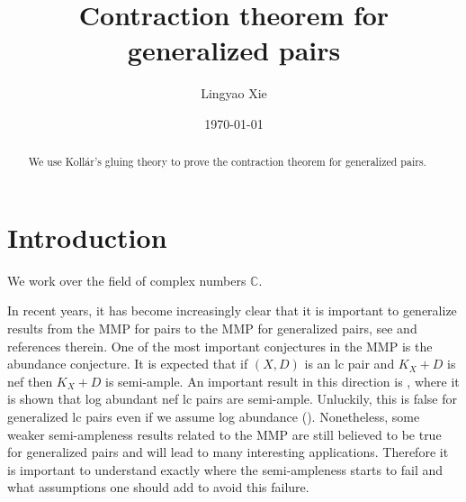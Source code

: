 \documentclass[11pt]{amsart}
\numberwithin{equation}{section}
\newcommand{\Qq}{\mathbb{Q}}
\theoremstyle{definition}
\theoremstyle{definition}
\theoremstyle{definition}
\begin{document}
\title{Contraction theorem for generalized pairs}
\author{Lingyao Xie}




\address{Department of Mathematics, The University of Utah, Salt Lake City, UT 84112, USA}



\date{\today}

\begin{abstract}
We use Koll\'ar's gluing theory to prove the contraction theorem for generalized pairs.%
\end{abstract}


\maketitle
\tableofcontents

\section{Introduction}

We work over the field of complex numbers $\mathbb C$. 

In recent years, it has become increasingly clear that it is important to generalize results from the MMP for pairs to the MMP for generalized pairs, see \cite{Bir21} and references therein. One of the most important conjectures in the MMP is the abundance conjecture. It is expected that if $(X,D)$ is an lc pair and $K_X+D$ is nef then $K_X+D$ is semi-ample. An important result in this direction is \cite{FG14,HX16}, where it is shown that log abundant nef lc pairs are semi-ample. Unluckily, this is false for generalized lc pairs even if we assume log abundance (\cite[Example 1.4]{LX22a}). Nonetheless, some weaker semi-ampleness results related to the MMP are still believed to be true for generalized pairs and will lead to many interesting applications. Therefore it is important to understand exactly where the semi-ampleness starts to fail and what assumptions one should add to avoid this failure. 


\end{document}
